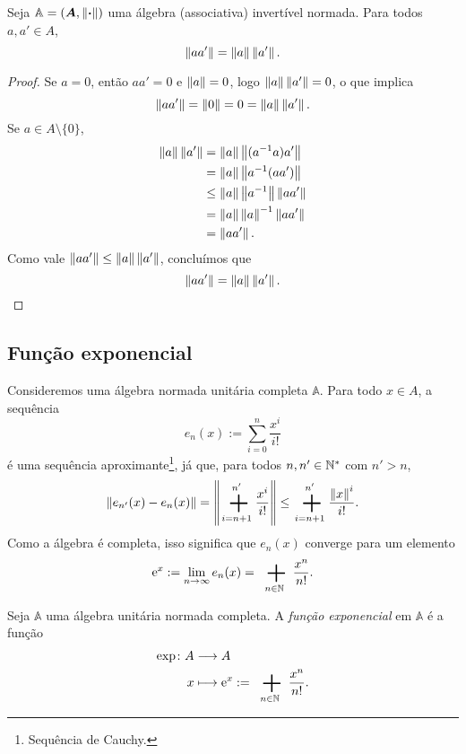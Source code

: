 \begin{exercise}
Seja $\mathbb A = (\bm A,\left\Vert{\bm{\cdot}}\right\Vert)$ uma álgebra (associativa) invertível normada. Para todos $a,a' \in A$,
	\begin{equation*}
	\left\Vert{aa'}\right\Vert = \left\Vert{a}\right\Vert\left\Vert{a'}\right\Vert.
	\end{equation*}
\end{exercise}
\begin{proof}
Se $a=0$, então $aa' = 0$ e $\left\Vert{a}\right\Vert=0$, logo $\left\Vert{a}\right\Vert\left\Vert{a'}\right\Vert=0$, o que implica
	\begin{equation*}
	\left\Vert{aa'}\right\Vert = \left\Vert{0}\right\Vert = 0 = \left\Vert{a}\right\Vert\left\Vert{a'}\right\Vert.
	\end{equation*}
Se $a \in A \setminus \{0\}$,
	\begin{align*}
	\left\Vert{a}\right\Vert\left\Vert{a'}\right\Vert &= \left\Vert{a}\right\Vert\left\Vert{(a^{-1}a)a'}\right\Vert \\
		&= \left\Vert{a}\right\Vert\left\Vert{a^{-1}(aa')}\right\Vert \\
		&\leq \left\Vert{a}\right\Vert\left\Vert{a^{-1}}\right\Vert \left\Vert{aa'}\right\Vert \\
		&= \left\Vert{a}\right\Vert\left\Vert{a}\right\Vert^{-1} \left\Vert{aa'}\right\Vert \\
		&= \left\Vert{aa'}\right\Vert.
	\end{align*}
Como vale $\left\Vert{aa'}\right\Vert \leq \left\Vert{a}\right\Vert\left\Vert{a'}\right\Vert$, concluímos que
	\begin{equation*}
	\left\Vert{aa'}\right\Vert = \left\Vert{a}\right\Vert\left\Vert{a'}\right\Vert.
	\qedhere
	\end{equation*}
\end{proof}


\subsection{Função exponencial}

Consideremos uma álgebra normada unitária completa $\mathbb A$. Para todo $x \in A$, a sequência
	\begin{equation*}
	e_n(x) := \sum_{i=0}^{n} \frac{x^i}{i!}
	\end{equation*}
é uma sequência aproximante\footnote{Sequência de Cauchy.}, já que, para todos $n,n' \in \mathbb{N}^*$ com $n' > n$,
	\begin{equation*}
	\nor{e_{n'}(x)-e_n(x)} = \nor{\sum_{i=n+1}^{n'} \frac{x^i}{i!}} \leq \sum_{i=n+1}^{n'} \frac{\nor{x}^i}{i!}.
	\end{equation*}
Como a álgebra é completa, isso significa que $e_n(x)$ converge para um elemento
	\begin{equation*}
	\ee^{x} := \lim_{n \to \infty} e_n(x) = \sum_{n \in \N} \frac{x^n}{n!}.
	\end{equation*}

\begin{definition}
Seja $\mathbb A$ uma álgebra unitária normada completa. A \emph{função exponencial} em $\mathbb A$ é a função
	\begin{align*}
	\func{\exp}{A}{A}{x}{\ee^{x} := \sum_{n \in \N} \frac{x^n}{n!}.}
	\end{align*}
\end{definition}

